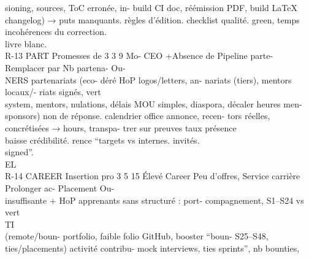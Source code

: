 \documentclass[12pt,landscape,a4paper]{article}
\begin{document}
sioning, sources,                        ToC erronée, in- build CI doc, réémission PDF, build LaTeX\\
changelog)     →                         puts manquants. règles d’édition. checklist qualité. green, temps\\
incohérences du                                                                                 correction.\\
livre blanc.\\
R-13       PART     Promesses       de 3 3 9   Mo- CEO      +Absence        de Pipeline parte- Remplacer par Nb partena- Ou-\\
NERS     partenariats (eco-         déré HoP      logos/letters, an- nariats    (tiers), mentors locaux/- riats signés, vert\\
system, mentors,                         nulations, délais MOU       simples, diaspora, décaler heures men-\\
sponsors)     non                        de réponse.        calendrier office annonce, recen- tors réelles,\\
concrétisées →                                              hours, transpa- trer sur preuves taux présence\\
baisse crédibilité.                                         rence “targets vs internes.          invités.\\
signed”.\\
\vspace{0.5em}
\vspace{0.5em}
\vspace{0.5em}
\vspace{0.5em}
EL\\
R-14       CAREER   Insertion     pro 3 5 15 Élevé Career     Peu       d’offres, Service carrière Prolonger      ac- Placement       Ou-\\
insuffisante                   + HoP      apprenants sans structuré : port- compagnement, S1–S24              vs vert\\
\vspace{0.5em}
\vspace{0.5em}
\vspace{0.5em}
\vspace{0.5em}
TI\\
(remote/boun-                             portfolio, faible folio      GitHub, booster “boun- S25–S48,\\
ties/placements)                          activité contribu- mock interviews, ties      sprints”, nb bounties,\\
\end{document}

